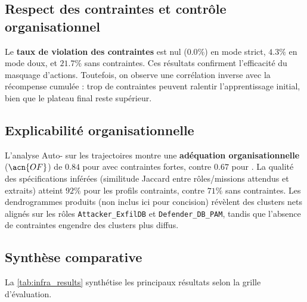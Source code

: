 \subsection*{Respect des contraintes et contrôle organisationnel}

Le \textbf{taux de violation des contraintes} est nul ($0.0\%$) en mode strict, $4.3\%$ en mode doux, et $21.7\%$ sans contraintes.
Ces résultats confirment l’efficacité du masquage d’actions.
Toutefois, on observe une corrélation inverse avec la récompense cumulée : trop de contraintes peuvent ralentir l’apprentissage initial, bien que le plateau final reste supérieur.

\subsection*{Explicabilité organisationnelle}

L’analyse Auto- sur les trajectoires montre une \textbf{adéquation organisationnelle} ($\acn{OF}$) de $0.84$ pour  avec contraintes fortes, contre $0.67$ pour .
La qualité des spécifications inférées (similitude Jaccard entre rôles/missions attendus et extraits) atteint $92\%$ pour les profils contraints, contre $71\%$ sans contraintes.
Les dendrogrammes produits (non inclus ici pour concision) révèlent des clusters nets alignés sur les rôles \texttt{Attacker\_ExfilDB} et \texttt{Defender\_DB\_PAM}, tandis que l’absence de contraintes engendre des clusters plus diffus.

\subsection*{Synthèse comparative}

La \autoref{tab:infra_results} synthétise les principaux résultats selon la grille d’évaluation.

